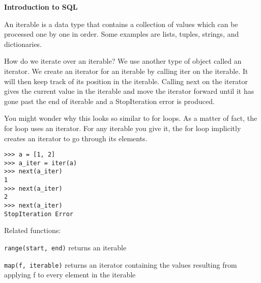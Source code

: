 \textbf{Introduction to SQL}

An iterable is a data type that contains a collection of values which can be processed one by one in order. Some examples are lists, tuples, strings, and dictionaries. 


How do we iterate over an iterable? We use another type of object called an iterator. We create an iterator for an iterable by calling iter on the iterable. It will then keep track of its position in the iterable. Calling next on the iterator gives the current value in the iterable and move the iterator forward until it has gone past the end of iterable and a StopIteration error is produced.

You might wonder why this looks so similar to for loops. As a matter of fact, the for loop uses an iterator. For any iterable you give it, the for loop implicitly creates an iterator to go through its elements.

\begin{lstlisting}
>>> a = [1, 2]
>>> a_iter = iter(a)
>>> next(a_iter)
1
>>> next(a_iter)
2
>>> next(a_iter)
StopIteration Error
\end{lstlisting}

Related functions:

\texttt{range(start, end)} returns an iterable

\texttt{map(f, iterable)} returns an iterator containing the values resulting from applying f to every element in the iterable